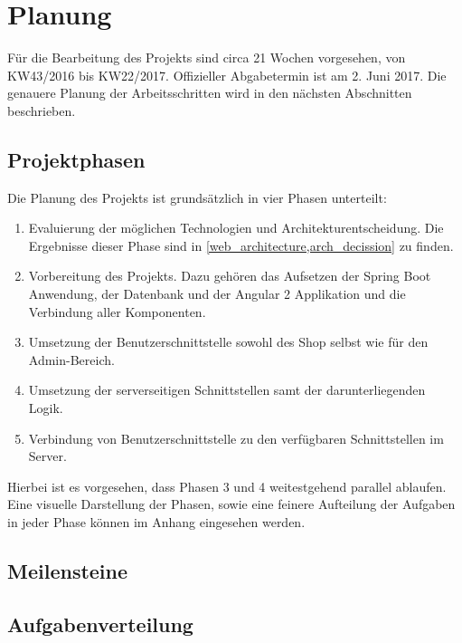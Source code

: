 \section{Planung}
Für die Bearbeitung des Projekts sind circa 21 Wochen vorgesehen, von KW43/2016 bis KW22/2017. Offizieller Abgabetermin ist am 2. Juni 2017. Die genauere Planung der Arbeitsschritten wird in den nächsten Abschnitten beschrieben.

\subsection{Projektphasen}
Die Planung des Projekts ist grundsätzlich in vier Phasen unterteilt:
\begin{enumerate}
	\item Evaluierung der möglichen Technologien und Architekturentscheidung. Die Ergebnisse dieser Phase sind in \cref{web_architecture,arch_decission} zu finden.
	\item Vorbereitung des Projekts. Dazu gehören das Aufsetzen der Spring Boot Anwendung, der Datenbank und der Angular 2 Applikation und die Verbindung aller Komponenten.
	\item Umsetzung der  Benutzerschnittstelle sowohl des Shop selbst wie für den Admin-Bereich.
	\item Umsetzung der serverseitigen Schnittstellen samt der darunterliegenden Logik.
	\item Verbindung von Benutzerschnittstelle zu den verfügbaren Schnittstellen im Server.
\end{enumerate}

Hierbei ist es vorgesehen, dass Phasen 3 und 4 weitestgehend parallel ablaufen. Eine visuelle Darstellung der Phasen, sowie eine feinere Aufteilung der Aufgaben in jeder Phase können im Anhang eingesehen werden.

\subsection{Meilensteine}

\subsection{Aufgabenverteilung}
